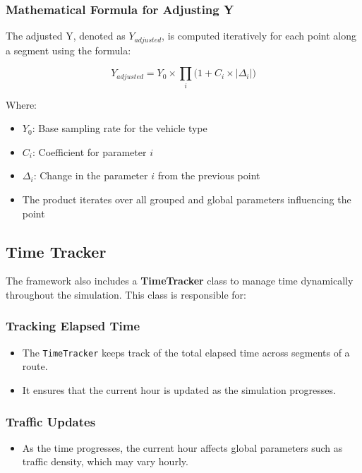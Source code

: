 \documentclass[a4paper,UKenglish,cleveref, autoref, thm-restate]{lipics-v2021}
\begin{document}
\subsubsection{Mathematical Formula for Adjusting Y}
The adjusted Y, denoted as $Y_{adjusted}$, is computed iteratively for each point along a segment using the formula:

\[
Y_{adjusted} = Y_0 \times \prod_{i} \big( 1 + C_i \times |\Delta_i| \big)
\]

Where:
\begin{itemize}
    \item $Y_0$: Base sampling rate for the vehicle type
    \item $C_i$: Coefficient for parameter $i$
    \item $\Delta_i$: Change in the parameter $i$ from the previous point
    \item The product iterates over all grouped and global parameters influencing the point
\end{itemize}

\subsection{Time Tracker}
The framework also includes a \textbf{TimeTracker} class to manage time dynamically throughout the simulation. This class is responsible for:

\subsubsection{Tracking Elapsed Time}
\begin{itemize}
    \item The \texttt{TimeTracker} keeps track of the total elapsed time across segments of a route.
    \item It ensures that the current hour is updated as the simulation progresses.
\end{itemize}

\subsubsection{Traffic Updates}
\begin{itemize}
    \item As the time progresses, the current hour affects global parameters such as traffic density, which may vary hourly.
\end{itemize}
\end{document}
